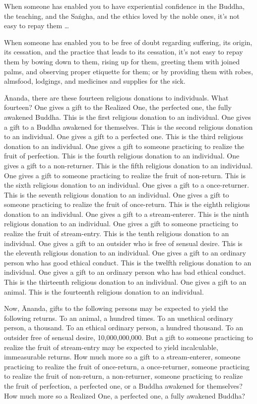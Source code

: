\documentclass[12pt,openany]{book}%
\begin{document}
When someone has enabled you to have experiential confidence in the Buddha, the teaching, and the \textsanskrit{Saṅgha}, and the ethics loved by the noble ones, it’s not easy to repay them … 

When someone has enabled you to be free of doubt regarding suffering, its origin, its cessation, and the practice that leads to its cessation, it’s not easy to repay them by bowing down to them, rising up for them, greeting them with joined palms, and observing proper etiquette for them; or by providing them with robes, almsfood, lodgings, and medicines and supplies for the sick. 

Ānanda, there are these fourteen religious donations to individuals. What fourteen? One gives a gift to the Realized One, the perfected one, the fully awakened Buddha. This is the first religious donation to an individual. One gives a gift to a Buddha awakened for themselves. This is the second religious donation to an individual. One gives a gift to a perfected one. This is the third religious donation to an individual. One gives a gift to someone practicing to realize the fruit of perfection. This is the fourth religious donation to an individual. One gives a gift to a non-returner. This is the fifth religious donation to an individual. One gives a gift to someone practicing to realize the fruit of non-return. This is the sixth religious donation to an individual. One gives a gift to a once-returner. This is the seventh religious donation to an individual. One gives a gift to someone practicing to realize the fruit of once-return. This is the eighth religious donation to an individual. One gives a gift to a stream-enterer. This is the ninth religious donation to an individual. One gives a gift to someone practicing to realize the fruit of stream-entry. This is the tenth religious donation to an individual. One gives a gift to an outsider who is free of sensual desire. This is the eleventh religious donation to an individual. One gives a gift to an ordinary person who has good ethical conduct. This is the twelfth religious donation to an individual. One gives a gift to an ordinary person who has bad ethical conduct. This is the thirteenth religious donation to an individual. One gives a gift to an animal. This is the fourteenth religious donation to an individual. 

Now, Ānanda, gifts to the following persons may be expected to yield the following returns. To an animal, a hundred times. To an unethical ordinary person, a thousand. To an ethical ordinary person, a hundred thousand. To an outsider free of sensual desire, 10,000,000,000. But a gift to someone practicing to realize the fruit of stream-entry may be expected to yield incalculable, immeasurable returns. How much more so a gift to a stream-enterer, someone practicing to realize the fruit of once-return, a once-returner, someone practicing to realize the fruit of non-return, a non-returner, someone practicing to realize the fruit of perfection, a perfected one, or a Buddha awakened for themselves? How much more so a Realized One, a perfected one, a fully awakened Buddha? 
\end{document}
